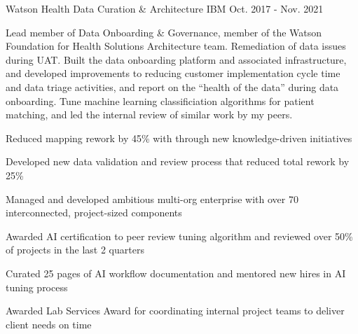 \begin{cventries}
    \cventry
    {Watson Health} %
    {Data Curation \& Architecture} %
    {IBM} %
    {Oct. 2017 - Nov. 2021} %
    {
      \begin{cvparagraph}
        Lead member of Data Onboarding \& Governance, member of the Watson Foundation for Health Solutions Architecture team.  Remediation of data issues during UAT.  Built the data onboarding platform and associated infrastructure, and developed improvements to reducing customer implementation cycle time and data triage activities, and report on the “health of the data” during data onboarding.  Tune machine learning classificiation algorithms for patient matching, and led the internal review of similar work by my peers.
      \end{cvparagraph}
      \begin{cvitems} %
        \item {Reduced mapping rework by 45\% with through new knowledge-driven initiatives}
        \item {Developed new data validation and review process that reduced total rework by 25\%}
        \item {Managed and developed ambitious multi-org enterprise with over 70 interconnected, project-sized components}
        \item {Awarded AI certification to peer review tuning algorithm and reviewed over 50\% of projects in the last 2 quarters}
        \item {Curated 25 pages of AI workflow documentation and mentored new hires in AI tuning process}
        \item {Awarded Lab Services Award for coordinating internal project teams to deliver client needs on time}
      \end{cvitems}
    }


\end{cventries}
